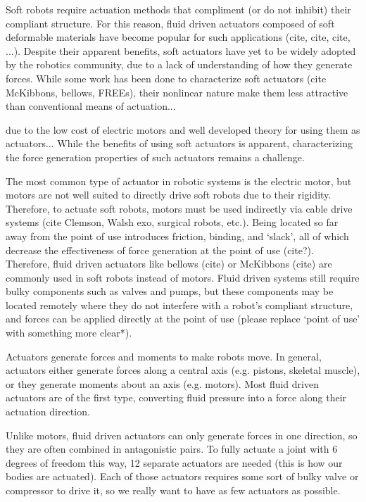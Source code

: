Soft robots require actuation methods that compliment (or do not inhibit) their compliant structure. For this reason, fluid driven actuators composed of soft deformable materials have become popular for such applications (cite, cite, cite, ...). Despite their apparent benefits, soft actuators have yet to be widely adopted by the robotics community, due to a lack of understanding of how they generate forces. While some work has been done to characterize soft actuators (cite McKibbons, bellows, FREEs), their nonlinear nature make them less attractive than conventional means of actuation... 

due to the low cost of electric motors and well developed theory for using them as actuators... While the benefits of using soft actuators is apparent, characterizing the force generation properties of such actuators remains a challenge.


The most common type of actuator in robotic systems is the electric motor, but motors are not well suited to directly drive soft robots due to their rigidity. Therefore, to actuate soft robots, motors must be used indirectly via cable drive systems (cite Clemson, Walsh exo, surgical robots, etc.). Being located so far away from the point of use introduces friction, binding, and `slack', all of which decrease the effectiveness of force generation at the point of use (cite?). Therefore, fluid driven actuators like bellows (cite) or McKibbons (cite) are commonly used in soft robots instead of motors. Fluid driven systems still require bulky components such as valves and pumps, but these components may be located remotely where they do not interfere with a robot's compliant structure, and forces can be applied directly at the point of use (please replace `point of use' with something more clear*).

Actuators generate forces and moments to make robots move. In general, actuators either generate forces along a central axis (e.g. pistons, skeletal muscle), or they generate moments about an axis (e.g. motors). Most fluid driven actuators are of the first type, converting fluid pressure into a force along their actuation direction. 

Unlike motors, fluid driven actuators can only generate forces in one direction, so they are often combined in antagonistic pairs. To fully actuate a joint with 6 degrees of freedom this way, 12 separate actuators are needed (this is how our bodies are actuated). Each of those actuators requires some sort of bulky valve or compressor to drive it, so we really want to have as few actuators as possible.

